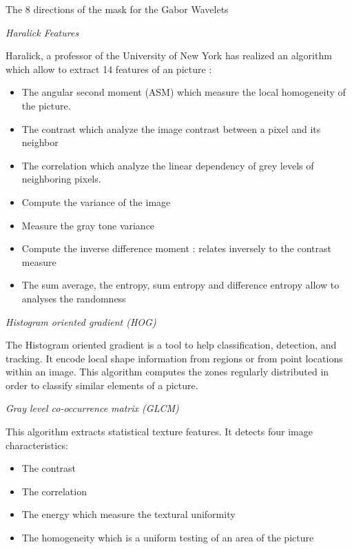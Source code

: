 
    The 8 directions of the mask for the Gabor Wavelets
    
\textit{Haralick Features}

Haralick, a professor of the University of New York has realized an algorithm which allow to extract 14 features of an picture : 

\begin{itemize}
\item The angular second moment (ASM) which measure the local homogeneity of the picture.
\end{itemize}
\begin{itemize}
\item The contrast which analyze the image contrast between a pixel and its neighbor
\end{itemize}
\begin{itemize}
\item The correlation which analyze the linear dependency of grey levels of neighboring pixels.
\end{itemize}
\begin{itemize}
\item Compute the variance of the image
\end{itemize}
\begin{itemize}
\item Measure the gray tone variance
\end{itemize}
\begin{itemize}
\item Compute the inverse difference moment : relates inversely to the contrast measure
\end{itemize}
\begin{itemize}
\item The sum average, the entropy, sum entropy and difference entropy allow to analyses the randomness
\end{itemize}


\textit{Histogram oriented gradient (HOG)}

The Histogram oriented gradient is a tool to help classification, detection, and tracking. It encode
local shape information from regions or from point locations within an image.
This algorithm computes the zones regularly distributed in order to classify similar elements of a picture. 

\textit{Gray level co-occurrence matrix (GLCM)}

This algorithm extracts statistical texture features.
It detects four image characteristics:
\begin{itemize}
\item The contrast
\end{itemize}
\begin{itemize}
\item The correlation 
\end{itemize}
\begin{itemize}
\item The energy which measure the textural uniformity
\end{itemize}
\begin{itemize}
\item The homogeneity which is a uniform testing of an area of the picture
\end{itemize}

